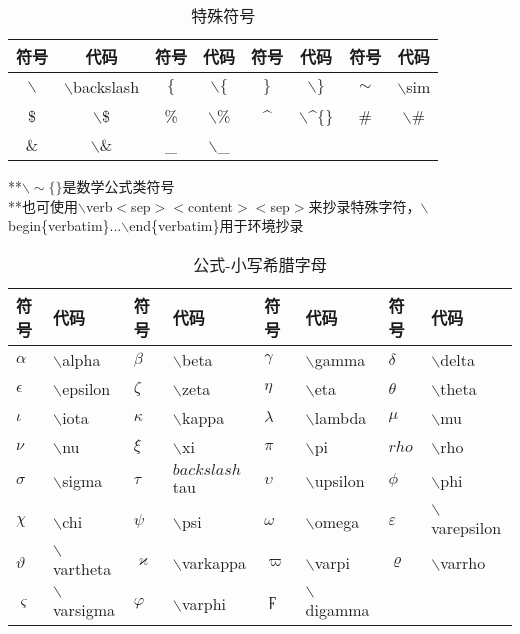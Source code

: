 \documentclass[UTF8,fontset=ubuntu]{ctexart}
\begin{document}
\begin{table}
\begin{tabular}{c c c c c c c c}
	\hline
	符号 & 代码 & 符号 & 代码 & 符号 & 代码 & 符号 & 代码\\
	\hline
	$\backslash$ & $\backslash$backslash & $\{$ & $\backslash\{$ & $\}$ & $\backslash\}$ & $\sim$ & $\backslash$sim\\
	\$ & $\backslash$\$ & \% & $\backslash$\% & \^{} & $\backslash$\^{}$\{\}$ & \# & $\backslash$\#\\
	\& & $\backslash$\& & \_ & $\backslash$\_\\
	\hline
\end{tabular}\par
**$\backslash \sim \{ \}$是数学公式类符号\\
**也可使用$\backslash$verb$<$sep$><$content$><$sep$>$来抄录特殊字符，$\backslash$begin\{verbatim\}...$\backslash$end\{verbatim\}用于环境抄录\\
\caption{特殊符号}
\end{table}
\begin{table}
\begin{tabular}{l l l l l l l l}
	\hline
	符号 & 代码 & 符号 & 代码 & 符号 & 代码 & 符号 & 代码\\
	\hline
	$\alpha$ & $\backslash$alpha & $\beta$ & $\backslash$beta & $\gamma$ & $\backslash$gamma & $\delta$ & $\backslash$delta\\
	$\epsilon$ & $\backslash$epsilon & $\zeta$ & $\backslash$zeta & $\eta$ & $\backslash$eta & $\theta$ & $\backslash$theta\\
	$\iota$ & $\backslash$iota & $\kappa$ & $\backslash$kappa & $\lambda$ & $\backslash$lambda & $\mu$ & $\backslash$mu\\
	$\nu$ & $\backslash$nu & $\xi$ & $\backslash$xi & $\pi$ & $\backslash$pi & $rho$ & $\backslash$rho\\
	$\sigma$ & $\backslash$sigma & $\tau$ & $backslash$tau & $\upsilon$ & $\backslash$upsilon & $\phi$ & $\backslash$phi\\
	$\chi$ & $\backslash$chi & $\psi$ & $\backslash$psi & $\omega$ & $\backslash$omega & $\varepsilon$ & $\backslash$varepsilon\\
	$\vartheta$ & $\backslash$vartheta & $\varkappa$ & $\backslash$varkappa\footnotemark[1] & $\varpi$ & $\backslash$varpi & $\varrho$ & $\backslash$varrho\footnotemark[1]\\
	$\varsigma$ & $\backslash$varsigma & $\varphi$ & $\backslash$varphi & $\digamma$ & $\backslash$digamma\footnotemark[1]\\
	\hline
\end{tabular}
\caption{公式-小写希腊字母}
\end{table}
\end{document}
